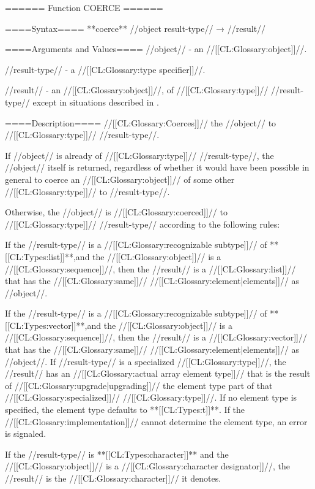 ====== Function COERCE ======

====Syntax====
**coerce** //object result-type// → //result//

====Arguments and Values====
//object// - an //[[CL:Glossary:object]]//.

//result-type// - a //[[CL:Glossary:type specifier]]//.

//result// - an //[[CL:Glossary:object]]//, of //[[CL:Glossary:type]]// //result-type// except in situations described in \secref\RuleOfCanonRepForComplexRationals.

====Description====
//[[CL:Glossary:Coerces]]// the //object// to //[[CL:Glossary:type]]// //result-type//.

If //object// is already of //[[CL:Glossary:type]]// //result-type//, the //object// itself is returned, regardless of whether it would have been possible in general to coerce an //[[CL:Glossary:object]]// of some other //[[CL:Glossary:type]]// to //result-type//.

Otherwise, the //object// is //[[CL:Glossary:coerced]]// to //[[CL:Glossary:type]]// //result-type// according to the following rules:

\beginlist


If the //result-type// is a //[[CL:Glossary:recognizable subtype]]// of **[[CL:Types:list]]**,and the //[[CL:Glossary:object]]// is a //[[CL:Glossary:sequence]]//, then the //result// is a //[[CL:Glossary:list]]// that has the //[[CL:Glossary:same]]// //[[CL:Glossary:element|elements]]// as //object//.

If the //result-type// is a //[[CL:Glossary:recognizable subtype]]// of **[[CL:Types:vector]]**,and the //[[CL:Glossary:object]]// is a //[[CL:Glossary:sequence]]//, then the //result// is a //[[CL:Glossary:vector]]// that has the //[[CL:Glossary:same]]// //[[CL:Glossary:element|elements]]// as //object//. If //result-type// is a specialized //[[CL:Glossary:type]]//, the //result// has an //[[CL:Glossary:actual array element type]]// that is the result of //[[CL:Glossary:upgrade|upgrading]]// the element type part of that //[[CL:Glossary:specialized]]// //[[CL:Glossary:type]]//. If no element type is specified, the element type defaults to **[[CL:Types:t]]**. If the //[[CL:Glossary:implementation]]// cannot determine the element type, an error is signaled.


If the //result-type// is **[[CL:Types:character]]** and the //[[CL:Glossary:object]]// is a //[[CL:Glossary:character designator]]//, the //result// is the //[[CL:Glossary:character]]// it denotes.

